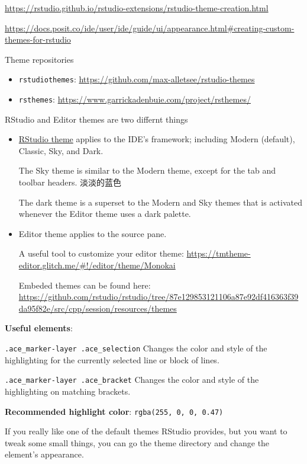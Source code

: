 \documentclass[
  a4paper,
  twoside,
  openright]{book}
\providecommand{\tightlist}{%
  \setlength{\itemsep}{0pt}\setlength{\parskip}{0pt}}
\theoremstyle{definition}
\theoremstyle{definition}
\theoremstyle{definition}
\theoremstyle{definition}
\theoremstyle{remark}
\begin{document}
\url{https://rstudio.github.io/rstudio-extensions/rstudio-theme-creation.html}

\url{https://docs.posit.co/ide/user/ide/guide/ui/appearance.html\#creating-custom-themes-for-rstudio}

Theme repositories

\begin{itemize}
\tightlist
\item
  \texttt{rstudiothemes}: \url{https://github.com/max-alletsee/rstudio-themes}
\item
  \texttt{rsthemes}: \url{https://www.garrickadenbuie.com/project/rsthemes/}
\end{itemize}

RStudio and Editor themes are two differnt things

\begin{itemize}
\item
  \href{https://support.posit.co/hc/en-us/articles/115011846747-Using-Themes-in-the-RStudio-IDE}{RStudio theme} applies to the IDE's framework; including Modern (default), Classic, Sky, and Dark.

  The Sky theme is similar to the Modern theme, except for the tab and toolbar headers. 淡淡的蓝色

  The dark theme is a superset to the Modern and Sky themes that is activated whenever the Editor theme uses a dark palette.
\item
  Editor theme applies to the source pane.

  A useful tool to customize your editor theme: \url{https://tmtheme-editor.glitch.me/\#!/editor/theme/Monokai}

  Embeded themes can be found here: \url{https://github.com/rstudio/rstudio/tree/87e129853121106a87e92df416363f39da95f82e/src/cpp/session/resources/themes}
\end{itemize}

\textbf{Useful elements}:

\texttt{.ace\_marker-layer\ .ace\_selection} Changes the color and style of the highlighting for the currently selected line or block of lines.

\texttt{.ace\_marker-layer\ .ace\_bracket} Changes the color and style of the highlighting on matching brackets.

\textbf{Recommended highlight color}: \texttt{rgba(255,\ 0,\ 0,\ 0.47)}

If you really like one of the default themes RStudio provides, but you want to tweak some small things, you can go the theme directory and change the element's appearance.
\end{document}
